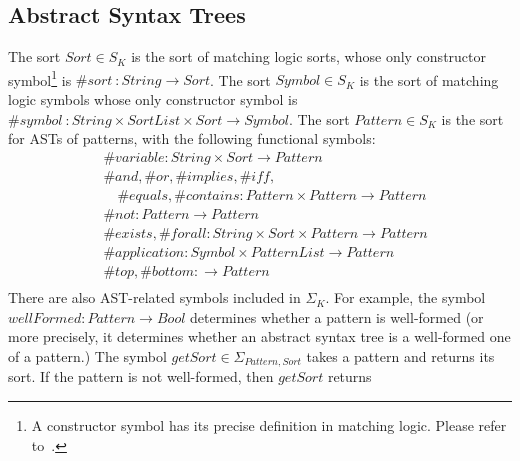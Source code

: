 \documentclass[UTF8]{article}
\theoremstyle{plain}
\theoremstyle{definition}
\theoremstyle{remark}
\begin{document}
\subsection{Abstract Syntax Trees}
The sort $\mathit{Sort} \in S_K$ is the sort of matching logic sorts, whose only constructor symbol\footnote{A constructor symbol has its precise definition in matching logic. Please refer to~\cite{?}.} is $\mathit{\#sort}\ \colon \mathit{String} \to \mathit{Sort}$.
The sort $\mathit{Symbol} \in S_K$ is the sort of matching logic symbols whose
only constructor symbol is $\mathit{\#symbol} \ \colon \mathit{String} \times \mathit{SortList} \times \mathit{Sort} \to \mathit{Symbol}$. 
The sort $\mathit{Pattern} \in S_K$ is the sort for ASTs of patterns, with the following functional symbols:
\begin{align*}
&\mathit{\#variable} \colon \mathit{String} \times \mathit{Sort} \to 
\mathit{Pattern} \\
&\mathit{\#and}, \mathit{\#or}, \mathit{\#implies}, \mathit{\#iff}, \\
&\quad \mathit{\#equals}, \mathit{\#contains} \colon \mathit{Pattern} \times 
\mathit{Pattern} \to \mathit{Pattern} \\
&\mathit{\#not} \colon \mathit{Pattern} \to \mathit{Pattern} \\
&\mathit{\#exists}, \mathit{\#forall} \colon \mathit{String} \times 
\mathit{Sort} \times \mathit{Pattern} \to \mathit{Pattern} \\
&\mathit{\#application} \colon \mathit{Symbol} \times \mathit{PatternList} \to 
\mathit{Pattern} \\
&\mathit{\#top}, \mathit{\#bottom} \colon \to \mathit{Pattern} \\
\end{align*}
There are also AST-related symbols included in $\Sigma_K$.
For example, the symbol $\mathit{wellFormed} \colon \mathit{Pattern} \to \mathit{Bool}$ determines whether a pattern is well-formed (or more precisely, it determines whether an abstract syntax tree is a well-formed one of a pattern.)
The symbol $\mathit{getSort} \in \Sigma_{\mathit{Pattern}, \mathit{Sort}}$ takes a pattern and returns its sort. If the pattern is not well-formed, then $\mathit{getSort}$ returns 
\end{document}
